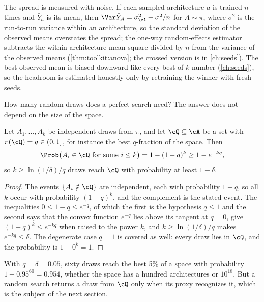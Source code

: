 \begin{refsection}
The spread is measured with noise. If each sampled architecture $a$ is trained $n$ times and $\bar Y_a$ is its mean, then $\Var\bar Y_A=\sigma_{\cA}^2+\sigma^2/n$ for $A\sim\pi$, where $\sigma^2$ is the run-to-run variance within an architecture, so the standard deviation of the observed means overstates the spread; the one-way random-effects estimator subtracts the within-architecture mean square divided by $n$ from the variance of the observed means (\cref{thm:toolkit:anova}; the crossed version is in \cref{ch:seeds}). The best observed mean is biased downward like every best-of-$k$ number (\cref{ch:seeds}), so the headroom is estimated honestly only by retraining the winner with fresh seeds.

How many random draws does a perfect search need? The answer does not depend on the size of the space.

\begin{proposition}\label{prop:controls:quantile}
Let $A_1,\dots,A_k$ be independent draws from $\pi$, and let $\cQ\subseteq\cA$ be a set with $\pi(\cQ)=q\in(0,1]$, for instance the best $q$-fraction of the space. Then
\[
  \Prob\bigl(A_i\in\cQ\text{ for some }i\le k\bigr)=1-(1-q)^k\ge1-e^{-kq},
\]
so $k\ge\ln(1/\delta)/q$ draws reach $\cQ$ with probability at least $1-\delta$.
\end{proposition}

\begin{proof}
The events $\{A_i\notin\cQ\}$ are independent, each with probability $1-q$, so all $k$ occur with probability $(1-q)^k$, and the complement is the stated event. The inequalities $0\le1-q\le e^{-q}$, of which the first is the hypothesis $q\le1$ and the second says that the convex function $e^{-q}$ lies above its tangent at $q=0$, give $(1-q)^k\le e^{-kq}$ when raised to the power $k$, and $k\ge\ln(1/\delta)/q$ makes $e^{-kq}\le\delta$. The degenerate case $q=1$ is covered as well: every draw lies in $\cQ$, and the probability is $1-0^k=1$.
\end{proof}

With $q=\delta=0.05$, sixty draws reach the best 5\% of a space with probability $1-0.95^{60}=0.954$, whether the space has a hundred architectures or $10^{18}$. But a random search returns a draw from $\cQ$ only when its proxy recognizes it, which is the subject of the next section.


\end{refsection}

